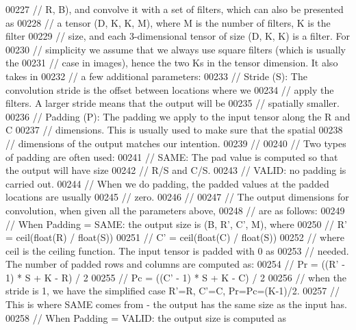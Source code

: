 \begin{DoxyCode}
00227 \textcolor{comment}{// R, B), and convolve it with a set of filters, which can also be presented as}
00228 \textcolor{comment}{// a tensor (D, K, K, M), where M is the number of filters, K is the filter}
00229 \textcolor{comment}{// size, and each 3-dimensional tensor of size (D, K, K) is a filter. For}
00230 \textcolor{comment}{// simplicity we assume that we always use square filters (which is usually the}
00231 \textcolor{comment}{// case in images), hence the two Ks in the tensor dimension.  It also takes in}
00232 \textcolor{comment}{// a few additional parameters:}
00233 \textcolor{comment}{// Stride (S): The convolution stride is the offset between locations where we}
00234 \textcolor{comment}{//             apply the filters.  A larger stride means that the output will be}
00235 \textcolor{comment}{//             spatially smaller.}
00236 \textcolor{comment}{// Padding (P): The padding we apply to the input tensor along the R and C}
00237 \textcolor{comment}{//              dimensions.  This is usually used to make sure that the spatial}
00238 \textcolor{comment}{//              dimensions of the output matches our intention.}
00239 \textcolor{comment}{//}
00240 \textcolor{comment}{// Two types of padding are often used:}
00241 \textcolor{comment}{//   SAME: The pad value is computed so that the output will have size}
00242 \textcolor{comment}{//         R/S and C/S.}
00243 \textcolor{comment}{//   VALID: no padding is carried out.}
00244 \textcolor{comment}{// When we do padding, the padded values at the padded locations are usually}
00245 \textcolor{comment}{// zero.}
00246 \textcolor{comment}{//}
00247 \textcolor{comment}{// The output dimensions for convolution, when given all the parameters above,}
00248 \textcolor{comment}{// are as follows:}
00249 \textcolor{comment}{// When Padding = SAME: the output size is (B, R', C', M), where}
00250 \textcolor{comment}{//   R' = ceil(float(R) / float(S))}
00251 \textcolor{comment}{//   C' = ceil(float(C) / float(S))}
00252 \textcolor{comment}{// where ceil is the ceiling function.  The input tensor is padded with 0 as}
00253 \textcolor{comment}{// needed.  The number of padded rows and columns are computed as:}
00254 \textcolor{comment}{//   Pr = ((R' - 1) * S + K - R) / 2}
00255 \textcolor{comment}{//   Pc = ((C' - 1) * S + K - C) / 2}
00256 \textcolor{comment}{// when the stride is 1, we have the simplified case R'=R, C'=C, Pr=Pc=(K-1)/2.}
00257 \textcolor{comment}{// This is where SAME comes from - the output has the same size as the input has.}
00258 \textcolor{comment}{// When Padding = VALID: the output size is computed as}

\end{DoxyCode}
